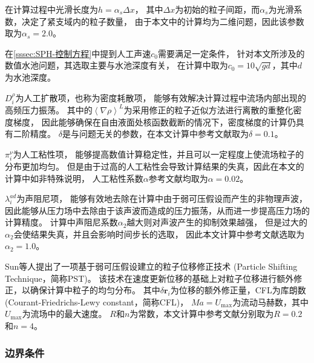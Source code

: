 在计算过程中光滑长度为$h = \alpha_s\Delta x$，%
其中$\Delta x$为初始的粒子间距，而$\alpha_s$为光滑系数，决定了紧支域内的粒子数量，%
由于本文中的计算均为二维问题，因此该参数取为$\alpha_s = 2.0$\cite{zhangSmoothedParticleHydrodynamics2017}。

在\cref{sssec:SPH-控制方程}中提到人工声速$c_0$需要满足一定条件，%
针对本文所涉及的数值水池问题，其选取主要与水池深度有关，%
在计算中取为$c_0 = 10\sqrt{gd}$，其中$d$为水池深度。

$D_i^{\rho}$为人工扩散项\cite{molteniSimpleProcedureImprove2009}，也称为密度耗散项，%
能够有效解决计算过程中流场内部出现的高频压力振荡。%
其中的$\left\langle \nabla\rho \right\rangle ^L$为采用修正的粒子近似方法进行离散的重整化密度梯度，%
因此能够确保在自由液面处核函数截断的情况下，密度梯度的计算仍具有二阶精度\cite{randlesSmoothedParticleHydrodynamics1996}。%
$\delta$是与问题无关的参数，在本文计算中参考文献\parencite{antuonoNumericalDiffusiveTerms2012}取为$\delta = 0.1$。%

$\pi_i^{\nu}$为人工粘性项\cite{marroneDSPHModelSimulating2011}，%
能够提高数值计算稳定性，并且可以一定程度上使流场粒子的分布更加均匀。%
但是由于过高的人工粘性会导致计算结果的失真，因此在本文的计算中如非特殊说明，%
人工粘性系数$\alpha$参考文献\parencite{antuonoNumericalDiffusiveTerms2012}均取为$\alpha = 0.02$。%

$\lambda_i^{ad}$为声阻尼项\cite{sunInclusionAcousticDamper2023}，%
能够有效地去除在计算中由于弱可压假设而产生的非物理声波，%
因此能够从压力场中去除由于该声波而造成的压力振荡，从而进一步提高压力场的计算精度。%
计算中声阻尼系数$\alpha_2$越大则对声波产生的抑制效果越强，%
但是过大的$\alpha_2$会使结果失真，并且会影响时间步长的选取，%
因此本文计算中参考文献\parencite{sunInclusionAcousticDamper2023}选取为$\alpha_2 = 1.0$。


Sun等人\cite{sunDplusSPHModelSimple2017}提出了一项基于弱可压假设建立的粒子位移修正技术 %
(Particle Shifting Technique，简称PST)。%
该技术在速度更新位移的基础上对粒子位移进行额外修正，以确保计算中粒子的均匀分布。%
其中$\delta\bm{r}_i$为位移的额外修正量，CFL为库朗数(Courant-Friedrichs-Lewy constant，简称CFL)，%
$Ma = U_{\max}$为流动马赫数，其中$U_{\max}$为流场中的最大速度。%
$R$和$n$为常数，本文计算中参考文献\parencite{monaghanSPHTensileInstability2000}分别取为$R = 0.2$和$n = 4$。

\subsubsection{
  \texorpdfstring{边界条件} %
  {\thesubsubsection 边界条件} %
}
\label{sssec:SPH-边界条件}

